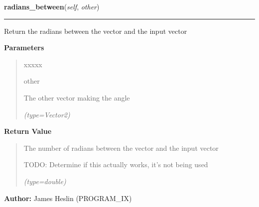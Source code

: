     \vspace{0.5ex}

\hspace{.8\funcindent}\begin{boxedminipage}{\funcwidth}

    \raggedright \textbf{radians\_between}(\textit{self}, \textit{other})

    \vspace{-1.5ex}

    \rule{\textwidth}{0.5\fboxrule}
\setlength{\parskip}{2ex}
    Return the radians between the vector and the input vector

\setlength{\parskip}{1ex}
      \textbf{Parameters}
      \vspace{-1ex}

      \begin{quote}
        \begin{Ventry}{xxxxx}

          \item[other]

          The other vector making the angle

            {\it (type=Vector2)}

        \end{Ventry}

      \end{quote}

      \textbf{Return Value}
    \vspace{-1ex}

      \begin{quote}
      The number of radians between the vector and the input vector

      TODO: Determine if this actually works, it's not being used

      {\it (type=double)}

      \end{quote}

\textbf{Author:} James Heslin (PROGRAM\_IX)



    \end{boxedminipage}

    \label{pystroke:vector2:Vector2:get_angle}

    \vspace{0.5ex}

